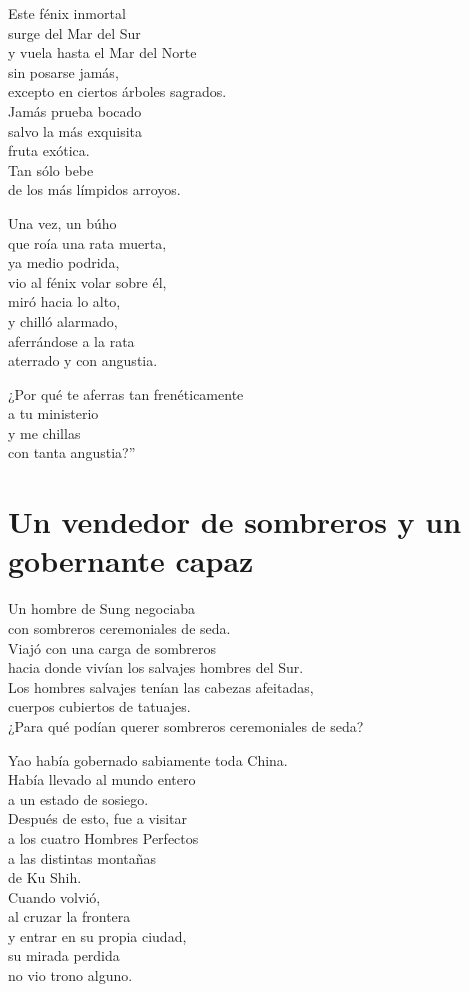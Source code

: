 \documentclass[hidelinks]{memoir}
\begin{document}
	Este fénix inmortal\\
	surge del Mar del Sur\\
	y vuela hasta el Mar del Norte\\
	sin posarse jamás,\\
	excepto en ciertos árboles sagrados.\\
	Jamás prueba bocado\\
	salvo la más exquisita\\
	fruta exótica.\\
	Tan sólo bebe\\
	de los más límpidos arroyos.
	
	Una vez, un búho\\
	que roía una rata muerta,\\
	ya medio podrida,\\
	vio al fénix volar sobre él,\\
	miró hacia lo alto,\\
	y chilló alarmado,\\
	aferrándose a la rata\\
	aterrado y con angustia.
	
	¿Por qué te aferras tan frenéticamente\\
	a tu ministerio\\
	y me chillas\\
	con tanta angustia?''
	
	\chapter*{Un vendedor de sombreros y un gobernante capaz}
	
	Un hombre de Sung negociaba\\
	con sombreros ceremoniales de seda.\\
	Viajó con una carga de sombreros\\
	hacia donde vivían los salvajes hombres del Sur.\\
	Los hombres salvajes tenían las cabezas afeitadas,\\
	cuerpos cubiertos de tatuajes.\\
	¿Para qué podían querer sombreros ceremoniales de seda?
	
	Yao había gobernado sabiamente toda China.\\
	Había llevado al mundo entero\\
	a un estado de sosiego.\\
	Después de esto, fue a visitar\\
	a los cuatro Hombres Perfectos\\
	a las distintas montañas\\
	de Ku Shih.\\
	Cuando volvió,\\
	al cruzar la frontera\\
	y entrar en su propia ciudad,\\
	su mirada perdida\\
	no vio trono alguno.
	
\end{document}
